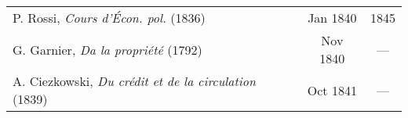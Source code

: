 \begin{table}[ht!]
\begin{threeparttable}
\begin{tabularx}{\linewidth}{Xcc}
        P. Rossi, \textit{Cours d'Écon. pol.} (1836) & Jan 1840 & 1845 \\
        
        G. Garnier, \textit{Da la propriété} (1792) & Nov 1840 & ---
        
        \\
        
        
        
        
        
        
        A. Ciezkowski, \textit{Du crédit et de la circulation} (1839) & Oct 1841 & --- \\
        
        
        
        
        
        

\end{tabularx}
\end{threeparttable}
\end{table}
